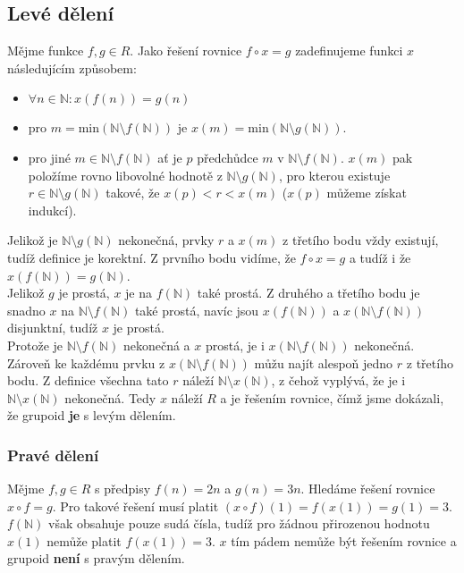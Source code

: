 \documentclass{scrartcl}
\begin{document}
    \subsection*{Levé dělení}
    Mějme funkce $f,g \in R$. Jako řešení rovnice $f \circ x = g$ zadefinujeme funkci $x$ následujícím způsobem:
    \begin{itemize}
        \item $\forall n \in \mathbb{N}: x(f(n)) = g(n)$
        \item pro $m = \text{min}(\mathbb{N} \setminus f(\mathbb{N}))$ je $x(m) = \text{min}(\mathbb{N} \setminus g(\mathbb{N}))$.
        \item pro jiné $m \in \mathbb{N} \setminus f(\mathbb{N})$ ať je $p$ předchůdce $m$ v $\mathbb{N} \setminus f(\mathbb{N})$. $x(m)$ pak položíme rovno libovolné hodnotě z $\mathbb{N} \setminus g(\mathbb{N})$, pro kterou existuje $r \in \mathbb{N} \setminus g(\mathbb{N})$ takové, že $x(p) < r < x(m)$ ($x(p)$ můžeme získat indukcí).
    \end{itemize}
    Jelikož je $\mathbb{N} \setminus g(\mathbb{N})$ nekonečná, prvky $r$ a $x(m)$ z třetího bodu vždy existují, tudíž definice je korektní. Z prvního bodu vidíme, že $f \circ x = g$ a tudíž i že $x(f(\mathbb{N})) = g(\mathbb{N})$.\\
    
    Jelikož $g$ je prostá, $x$ je na $f(\mathbb{N})$ také prostá. Z druhého a třetího bodu je snadno $x$ na $\mathbb{N} \setminus f(\mathbb{N})$ také prostá, navíc jsou $x(f(\mathbb{N}))$ a $x(\mathbb{N} \setminus f(\mathbb{N}))$ disjunktní, tudíž $x$ je prostá.\\

    Protože je $\mathbb{N} \setminus f(\mathbb{N})$ nekonečná a $x$ prostá, je i $x(\mathbb{N} \setminus f(\mathbb{N}))$ nekonečná. Zároveň ke každému prvku z $x(\mathbb{N} \setminus f(\mathbb{N}))$ můžu najít alespoň jedno $r$ z třetího bodu. Z definice všechna tato $r$ náleží $\mathbb{N} \setminus x(\mathbb{N})$, z čehož vyplývá, že je i $\mathbb{N} \setminus x(\mathbb{N})$ nekonečná. Tedy $x$ náleží $R$ a je řešením rovnice, čímž jsme dokázali, že grupoid \textbf{je} s levým dělením.

    \subsubsection*{Pravé dělení}
    Mějme $f,g \in R$ s předpisy $f(n) = 2n$ a $g(n) = 3n$. Hledáme řešení rovnice $x \circ f = g$. Pro takové řešení musí platit $(x \circ f)(1) = f(x(1)) = g(1) = 3$. $f(\mathbb{N})$ však obsahuje pouze sudá čísla, tudíž pro žádnou přirozenou hodnotu $x(1)$ nemůže platit $f(x(1)) = 3$. $x$ tím pádem nemůže být řešením rovnice a grupoid \textbf{není} s pravým dělením.
\end{document}

